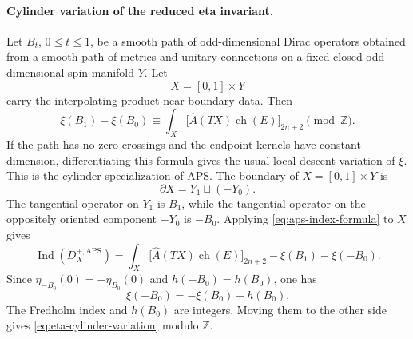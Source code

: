 \paragraph{Cylinder variation of the reduced eta invariant.}
Let \(B_t\), \(0\leq t\leq1\), be a smooth path of odd-dimensional Dirac
operators obtained from a smooth path of metrics and unitary connections on a
fixed closed odd-dimensional spin manifold \(Y\).  Let
\[
  X=[0,1]\times Y
\]
carry the interpolating product-near-boundary data.  Then
\begin{equation}
  \xi(B_1)-\xi(B_0)
  \equiv
  \int_X
  \bigl[\widehat A(TX)\operatorname{ch}(E)\bigr]_{2n+2}
  \pmod{\mathbb Z}.
  \label{eq:eta-cylinder-variation}
\end{equation}
If the path has no zero crossings and the endpoint kernels have constant
dimension, differentiating this formula gives the usual local descent
variation of \(\xi\).
This is the cylinder specialization of APS.  The boundary of
\(X=[0,1]\times Y\) is
\[
  \partial X=Y_1\sqcup(-Y_0).
\]
The tangential operator on \(Y_1\) is \(B_1\), while the tangential operator on
the oppositely oriented component \(-Y_0\) is \(-B_0\).  Applying
\eqref{eq:aps-index-formula} to \(X\) gives
\[
  \operatorname{Ind}(D_X^{+,\mathrm{APS}})
  =
  \int_X
  \bigl[\widehat A(TX)\operatorname{ch}(E)\bigr]_{2n+2}
  -
  \xi(B_1)-\xi(-B_0).
\]
Since \(\eta_{-B_0}(0)=-\eta_{B_0}(0)\) and
\(h(-B_0)=h(B_0)\), one has
\[
  \xi(-B_0)
  =
  -\xi(B_0)+h(B_0).
\]
The Fredholm index and \(h(B_0)\) are integers.  Moving them to the other
side gives \eqref{eq:eta-cylinder-variation} modulo \(\mathbb Z\).

